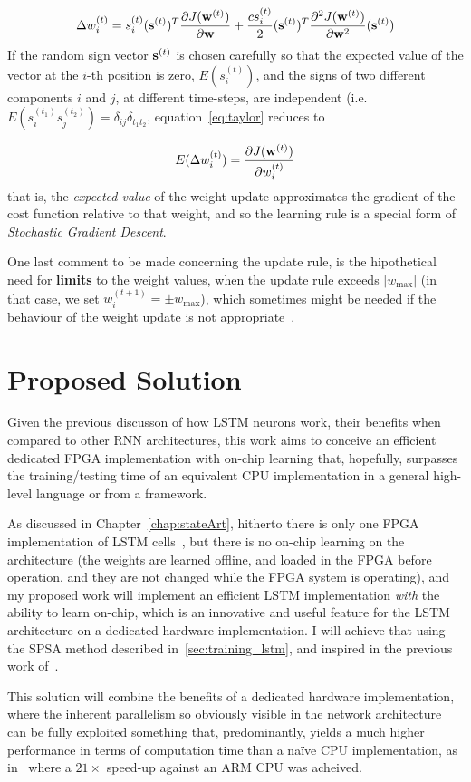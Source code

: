 \begin{equation}\label{eq:taylor}
    \Delta w_i^{(t)} = s_i^{(t)} (\mathbf{s}^{(t)})^T \frac{\partial J(\mathbf{w}^{(t)})}{\partial \mathbf{w}} +
                        \frac{c s_i^{(t)}}{2} (\mathbf{s}^{(t)})^T \frac{\partial^2 J(\mathbf{w}^{(t)})}{\partial \mathbf{w}^2}  (\mathbf{s}^{(t)}) 
\end{equation}
If the random sign vector $\mathbf{s}^{(t)}$ is chosen carefully so that the expected value of the vector at the $i$-th position is zero, $E(s_i^{(t)})$, and the signs of two different components $i$ and $j$, at different time-steps, are independent (i.e. $E(s_i^{(t_1)}s_j^{(t_2)}) = \delta_{ij}\delta_{t_1 t_2}$, equation~\ref{eq:taylor} reduces to

\begin{equation}\label{eq:spsa_gradProof}
    E(\Delta w_i^{(t)}) = \frac{\partial J(\mathbf{w}^{(t)})}{\partial w_i^{(t)}}
\end{equation}
that is, the \emph{expected value} of the weight update approximates the gradient of the cost function relative to that weight, and so the learning rule is a special form of \textit{Stochastic Gradient Descent}.

One last comment to be made concerning the update rule, is the hipothetical need for \textbf{limits} to the weight values, when the update rule exceeds $|w_{\text{max}}|$ (in that case, we set $w_i^{(t+1)} = \pm w_{\text{max}}$), which sometimes might be needed if the behaviour of the weight update is not appropriate~\cite{Maeda05}.

\section{Proposed Solution}\label{sec:propSol}
Given the previous discusson of how LSTM neurons work, their benefits when compared to other RNN architectures, this work aims to conceive an efficient dedicated FPGA implementation with on-chip learning that, hopefully, surpasses the training/testing time of an equivalent CPU implementation in a general high-level language or from a framework. 

As discussed in Chapter~\ref{chap:stateArt}, hitherto there is only one FPGA implementation of LSTM cells~\cite{Chang15}, but there is no on-chip learning on the architecture (the weights are learned offline, and loaded in the FPGA before operation, and they are not changed while the FPGA system is operating), and my proposed work will implement an efficient LSTM implementation \emph{with} the ability to learn on-chip, which is an innovative and useful feature for the LSTM architecture on a dedicated hardware implementation. I will achieve that using the SPSA method described in~\ref{sec:training_lstm}, and inspired in the previous work of~\cite{Maeda05}.

This solution will combine the benefits of a dedicated hardware implementation, where the inherent parallelism so obviously visible in the network architecture can be fully exploited something that, predominantly, yields a much higher performance in terms of computation time than a naïve CPU implementation, as in~\cite{Maeda05} where a $21\times$ speed-up against an ARM CPU was acheived. 
